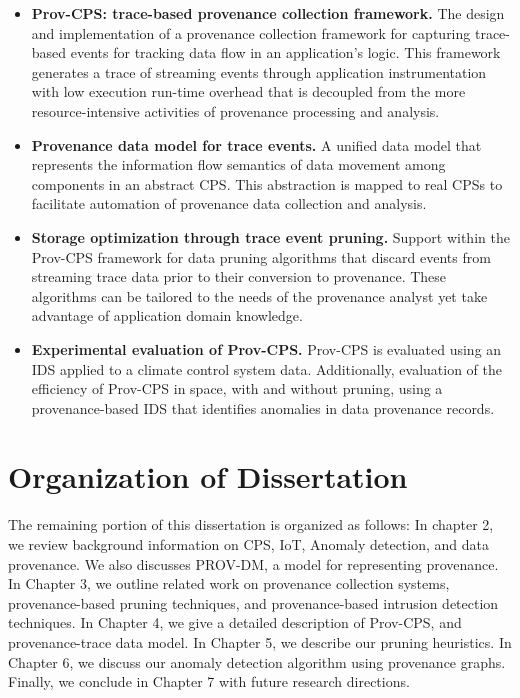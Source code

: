 \begin{itemize}

\item \textbf{Prov-CPS: trace-based provenance collection framework.} The design and implementation of a provenance collection framework for capturing trace-based events for tracking data flow in an application's logic. This framework generates a trace of streaming events through application instrumentation with low execution run-time overhead that is decoupled from the more resource-intensive activities of provenance processing and analysis.

\item \textbf{Provenance data model for trace events.} A unified data model that represents the information flow semantics of data movement among components in an abstract CPS. This abstraction is mapped to real CPSs to facilitate automation of provenance data collection and analysis.

\item \textbf{Storage optimization through trace event pruning.} Support within the Prov-CPS framework for data pruning algorithms that discard events from streaming trace data prior to their conversion to provenance. These algorithms can be tailored to the needs of the provenance analyst yet take advantage of application domain knowledge.

\item \textbf{Experimental evaluation of Prov-CPS.} Prov-CPS is evaluated using an IDS applied to a climate control system data. Additionally, evaluation of the efficiency of Prov-CPS in space, with and without pruning, using a provenance-based IDS that identifies anomalies in data provenance records.



\end{itemize}

\section{Organization of Dissertation}

The remaining portion of this dissertation is organized as follows: In chapter 2, we review background information on CPS, IoT, Anomaly detection, and data provenance. We also discusses PROV-DM, a model for representing provenance. In Chapter 3, we outline related work on provenance collection systems, provenance-based pruning techniques, and provenance-based intrusion detection techniques. In Chapter 4, we give a detailed description of Prov-CPS, and provenance-trace data model. In Chapter 5, we describe our pruning heuristics. In Chapter 6, we discuss our anomaly detection algorithm using provenance graphs. Finally, we conclude in Chapter 7 with future research directions.

